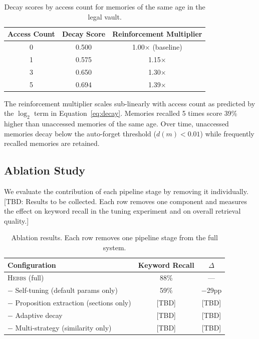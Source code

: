 \documentclass{article}
\begin{document}
\begin{table}[h]
\centering
\caption{Decay scores by access count for memories of the same age in the legal vault.}
\label{tab:decay}
\small
\begin{tabular}{@{}ccc@{}}
\toprule
\textbf{Access Count} & \textbf{Decay Score} & \textbf{Reinforcement Multiplier} \\
\midrule
0 & 0.500 & 1.00$\times$ (baseline) \\
1 & 0.575 & 1.15$\times$ \\
3 & 0.650 & 1.30$\times$ \\
5 & 0.694 & 1.39$\times$ \\
\bottomrule
\end{tabular}
\end{table}

The reinforcement multiplier scales sub-linearly with access count as predicted by the $\log_2$ term in Equation~\ref{eq:decay}. Memories recalled 5 times score 39\% higher than unaccessed memories of the same age. Over time, unaccessed memories decay below the auto-forget threshold ($d(m) < 0.01$) while frequently recalled memories are retained.

\subsection{Ablation Study}
\label{sec:exp_ablation}

We evaluate the contribution of each pipeline stage by removing it individually. [TBD: Results to be collected. Each row removes one component and measures the effect on keyword recall in the tuning experiment and on overall retrieval quality.]

\begin{table}[h]
\centering
\caption{Ablation results. Each row removes one pipeline stage from the full system.}
\label{tab:ablation}
\small
\begin{tabular}{@{}lcc@{}}
\toprule
\textbf{Configuration} & \textbf{Keyword Recall} & \textbf{$\Delta$} \\
\midrule
\textsc{Hebbs} (full) & 88\% & --- \\
$-$ Self-tuning (default params only) & 59\% & $-$29pp \\
$-$ Proposition extraction (sections only) & [TBD] & [TBD] \\
$-$ Adaptive decay & [TBD] & [TBD] \\
$-$ Multi-strategy (similarity only) & [TBD] & [TBD] \\
\bottomrule
\end{tabular}
\end{table}
\end{document}
